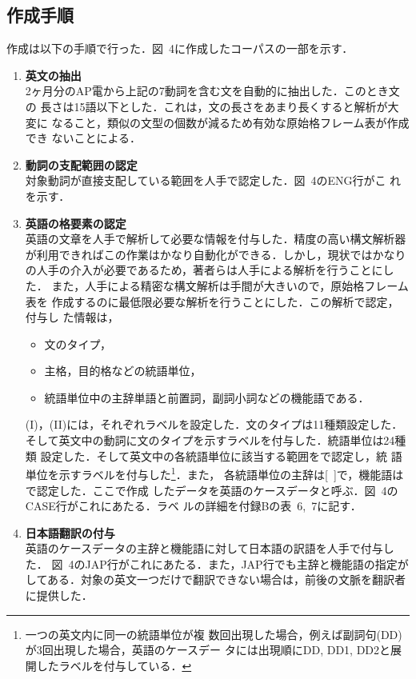 \subsection{作成手順}

作成は以下の手順で行った．図~4に作成したコーパスの一部を示す．
\begin{enumerate}
\item {\bf 英文の抽出}\\
  2ヶ月分のAP電から上記の7動詞を含む文を自動的に抽出した．このとき文の
  長さは15語以下とした．これは，文の長さをあまり長くすると解析が大変に
  なること，類似の文型の個数が減るため有効な原始格フレーム表が作成でき
  ないことによる．

\item {\bf 動詞の支配範囲の認定}\\
  対象動詞が直接支配している範囲を人手で認定した．図~4のENG行がこ
  れを示す．

\item {\bf 英語の格要素の認定}\\
  英語の文章を人手で解析して必要な情報を付与した．精度の高い構文解析器
  が利用できればこの作業はかなり自動化ができる．しかし，現状ではかなり
  の人手の介入が必要であるため，著者らは人手による解析を行うことにした．
  また，人手による精密な構文解析は手間が大きいので，原始格フレーム表を
  作成するのに最低限必要な解析を行うことにした．この解析で認定，付与し
  た情報は，
\begin{itemize}
\item[(I)] 文のタイプ，
\item[(II)] 主格，目的格などの統語単位，
\item[(III)] 統語単位中の主辞単語と前置詞，副詞小詞などの機能語である．
\end{itemize}
(I)，(II)には，それぞれラベルを設定した．文のタイプは11種類設定した．
そして英文中の動詞に文のタイプを示すラベルを付与した．統語単位は24種類
設定した．そして英文中の各統語単位に該当する範囲を\bras{ }で認定し，統
語単位を示すラベルを付与した\footnote{一つの英文内に同一の統語単位が複
  数回出現した場合，例えば副詞句(DD)が3回出現した場合，英語のケースデー
  タには出現順にDD, DD1, DD2と展開したラベルを付与している．}．また，
各統語単位の主辞は{[\ ]}で，機能語は\pp{\enskip}で認定した．ここで作成
したデータを英語のケースデータと呼ぶ．図~4のCASE行がこれにあたる．ラベ
ルの詳細を付録Bの表~6,~7に記す．

\item{\bf 日本語翻訳の付与}\\
  英語のケースデータの主辞と機能語に対して日本語の訳語を人手で付与した．
  図~4のJAP行がこれにあたる．また，JAP行でも主辞と機能語の指定が
  してある．対象の英文一つだけで翻訳できない場合は，前後の文脈を翻訳者
  に提供した．
\end{enumerate}

